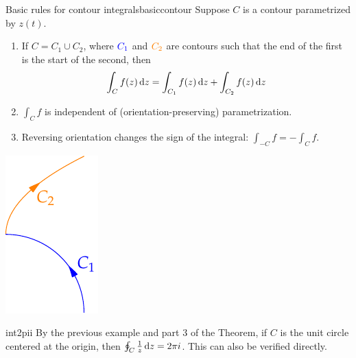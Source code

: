 \begin{thm}{Basic rules for contour integrals}{basiccontour}
	Suppose $C$ is a contour parametrized by $z(t)$.\par
	\begin{minipage}[t]{0.75\linewidth}\vspace{-5pt}
		\begin{enumerate}
		  \item If $C=C_1\cup C_2$, where $\textcolor{blue}{C_1}$ and $\textcolor{orange}{C_2}$ are contours such that the end of the first is the start of the second, then
		  \[
		  	\int_Cf(z)\,{\mathrm{d} z}=\int_{C_1}f(z)\,{\mathrm{d} z}+\int_{C_2}f(z)\,{\mathrm{d} z}
		  \]
		  \item $\int_Cf$ is independent of (orientation-preserving) parametrization.
		  \item Reversing orientation changes the sign of the integral: $\int_{-C}f=-\int_Cf$.
		\end{enumerate}
	\end{minipage}
	\hfill
	\begin{minipage}[t]{0.24\linewidth}\vspace{-5pt}
		\flushright\includegraphics{contours-ex5}
	\end{minipage}
\end{thm}


\begin{example}{}{int2pii}
	By the previous example and part 3 of the Theorem, if $C$ is the unit circle centered at the origin, then $\oint_C\frac 1z\,{\mathrm{d} z}=2\pi i$. This can also be verified  directly.
\end{example}
\goodbreak



